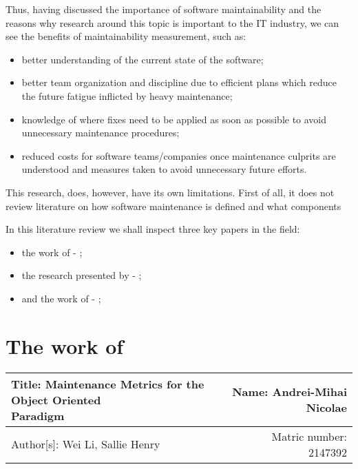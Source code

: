 \documentclass[a4paper,portrait,12pt]{article}
\begin{document}
  Thus, having discussed the importance of software maintainability and the
  reasons why research around this topic is important to the IT industry,
  we can see the benefits of maintainability measurement, such as:
    \begin{itemize}
      \item better understanding of the current state of the software;
      \item better team organization and discipline due to efficient plans 
      which reduce the future fatigue inflicted by heavy maintenance;
      \item knowledge of where fixes need to be applied as soon as possible
      to avoid unnecessary maintenance procedures;
      \item reduced costs for software teams/companies once maintenance 
      culprits are understood and measures taken to avoid unnecessary future
      efforts.
    \end{itemize}

  This research, does, however, have its own limitations. First of all, it does
  not review literature on how software maintenance is defined and what 
  components 
  
  In this literature review we shall inspect three key papers in the field:
    \begin{itemize}
      \item the work of \citet{oman1992metrics} - ;
      \item the research presented by \citet{pfleeger1990framework} - ;
      \item and the work of \citet{li1993maintenance} - ;
    \end{itemize}

 \section{The work of \cite{li1993maintenance}}

 \begin{center}
   \begin{tabular}{ | l | r | }
    \hline
    \parbox[t]{5cm}{Title: Maintenance Metrics for the Object Oriented
                    \\ Paradigm} 
     & Name: Andrei-Mihai Nicolae \\ 
     \hline
     Author[s]: Wei Li, Sallie Henry & Matric number: 2147392 \\
    \hline
   \end{tabular}
 \end{center}
\end{document}
